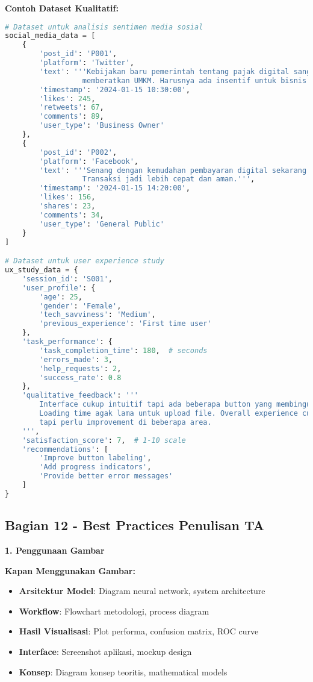 \textbf{Contoh Dataset Kualitatif:}
\begin{lstlisting}[language=python, style=python, caption=Dataset Kualitatif untuk Data Science]
# Dataset untuk analisis sentimen media sosial
social_media_data = [
    {
        'post_id': 'P001',
        'platform': 'Twitter',
        'text': '''Kebijakan baru pemerintah tentang pajak digital sangat
                  memberatkan UMKM. Harusnya ada insentif untuk bisnis kecil.''',
        'timestamp': '2024-01-15 10:30:00',
        'likes': 245,
        'retweets': 67,
        'comments': 89,
        'user_type': 'Business Owner'
    },
    {
        'post_id': 'P002',
        'platform': 'Facebook',
        'text': '''Senang dengan kemudahan pembayaran digital sekarang.
                  Transaksi jadi lebih cepat dan aman.''',
        'timestamp': '2024-01-15 14:20:00',
        'likes': 156,
        'shares': 23,
        'comments': 34,
        'user_type': 'General Public'
    }
]

# Dataset untuk user experience study
ux_study_data = {
    'session_id': 'S001',
    'user_profile': {
        'age': 25,
        'gender': 'Female',
        'tech_savviness': 'Medium',
        'previous_experience': 'First time user'
    },
    'task_performance': {
        'task_completion_time': 180,  # seconds
        'errors_made': 3,
        'help_requests': 2,
        'success_rate': 0.8
    },
    'qualitative_feedback': '''
        Interface cukup intuitif tapi ada beberapa button yang membingungkan.
        Loading time agak lama untuk upload file. Overall experience cukup baik
        tapi perlu improvement di beberapa area.
    ''',
    'satisfaction_score': 7,  # 1-10 scale
    'recommendations': [
        'Improve button labeling',
        'Add progress indicators',
        'Provide better error messages'
    ]
}
\end{lstlisting}

\subsection*{Bagian 12 - Best Practices Penulisan TA}

\textbf{1. Penggunaan Gambar}

\textbf{Kapan Menggunakan Gambar:}
\begin{itemize}
    \item \textbf{Arsitektur Model}: Diagram neural network, system architecture
    \item \textbf{Workflow}: Flowchart metodologi, process diagram
    \item \textbf{Hasil Visualisasi}: Plot performa, confusion matrix, ROC curve
    \item \textbf{Interface}: Screenshot aplikasi, mockup design
    \item \textbf{Konsep}: Diagram konsep teoritis, mathematical models
\end{itemize}

